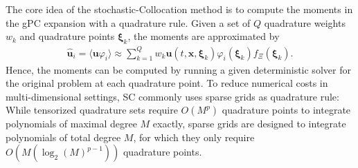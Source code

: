 The core idea of the stochastic-Collocation method is to compute the moments in the gPC expansion with a quadrature rule. Given a set of $Q$ quadrature weights $w_k$ and quadrature points $\bm{\xi}_k$, the moments are approximated by
\begin{align*}
\bm{\hat u}_i = \langle \bm{u}\varphi_i \rangle \approx \sum_{k = 1}^{Q}w_k \bm{u}({t,\bm{x},\bm{\xi}_k})\varphi_i(\bm{\xi}_k)f_{\Xi}(\bm{\xi}_k).
\end{align*} 
Hence, the moments can be computed by running a given deterministic solver for the original problem at each quadrature point. To reduce numerical costs in multi-dimensional settings, SC commonly uses sparse grids as quadrature rule: While tensorized quadrature sets require $O(M^p)$ quadrature points to integrate polynomials of maximal degree $M$ exactly, sparse grids are designed to integrate polynomials of total degree $M$, for which they only require $O(M(\log_2(M)^{p-1}))$ quadrature points. 

